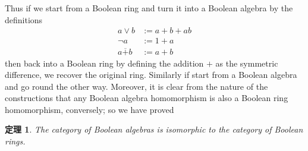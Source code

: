 \documentclass[a4j,12pt]{jarticle}
\numberwithin{equation}{section}
\newtheorem{thm}{定理}[section]
\begin{document}
Thus if we start from a Boolean ring and turn it into a Boolean algebra by the definitions
\begin{align*}
  a \vee b &:= a + b +ab \\
  \neg a &:= 1 + a \\
  a \overline{+} b &:= a + b
\end{align*}
then back into a Boolean ring by defining the addition $+$ as the symmetric difference, we recover the original ring.
Similarly if start from a Boolean algebra and go round the other way.
Moreover, it is clear from the nature of the constructions that any Boolean algebra homomorphism is also a Boolean ring homomorphism, conversely; so we have proved
\begin{thm}
  The category of Boolean algebras is isomorphic to the category of Boolean rings.
\end{thm}
\end{document}
